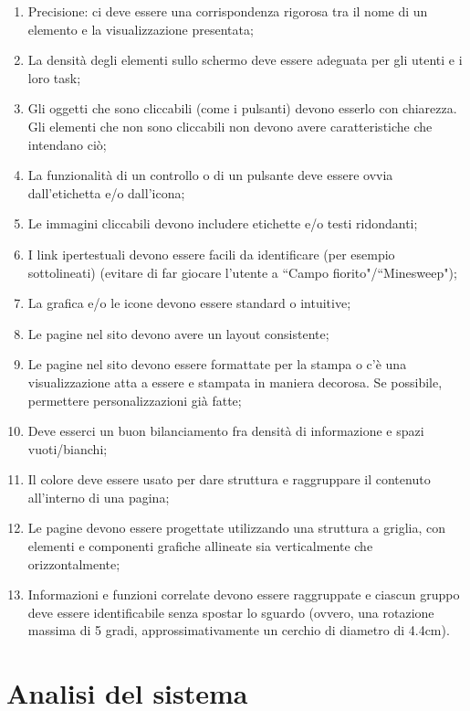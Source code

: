 \begin{enumerate}
    \item Precisione: ci deve essere una corrispondenza rigorosa tra il nome di un elemento e la visualizzazione presentata;\label{lg:30}
    \item La densità degli elementi sullo schermo deve essere adeguata per gli utenti e i loro task;\label{lg:31}
    \item Gli oggetti che sono cliccabili (come i pulsanti) devono esserlo con chiarezza. Gli elementi che non sono cliccabili non devono avere caratteristiche che intendano ciò;\label{lg:32}
    \item La funzionalità di un controllo o di un pulsante deve essere ovvia dall'etichetta e/o dall'icona;\label{lg:33}
    \item Le immagini  cliccabili devono includere etichette e/o testi ridondanti;\label{lg:34}
    \item I link ipertestuali devono essere facili da identificare (per esempio sottolineati) (evitare di far giocare l'utente a ``Campo fiorito"/``Minesweep");\label{lg:35}
    \item La grafica e/o le icone devono essere standard o intuitive;\label{lg:36}
    \item Le pagine nel sito devono avere un layout consistente;\label{lg:37}
    \item Le pagine nel sito devono essere formattate per la stampa o c'è una visualizzazione atta a essere e stampata in maniera decorosa. Se possibile, permettere personalizzazioni già fatte;\label{lg:38}
    \item Deve esserci un buon bilanciamento fra densità di informazione e spazi vuoti/bianchi;\label{lg:39}
    \item Il colore deve essere usato per dare struttura e raggruppare il contenuto all'interno di una pagina;\label{lg:40}
    \item Le pagine devono essere progettate utilizzando una struttura a griglia, con elementi e componenti grafiche allineate sia verticalmente che orizzontalmente;\label{lg:41}
    \item Informazioni e funzioni correlate devono essere raggruppate e ciascun gruppo deve essere identificabile senza spostar lo sguardo (ovvero, una rotazione massima di 5 gradi, approssimativamente un cerchio di diametro di 4.4cm).\label{lg:42}
\end{enumerate}

\section{Analisi del sistema}
\label{s:analisi-sistema}

